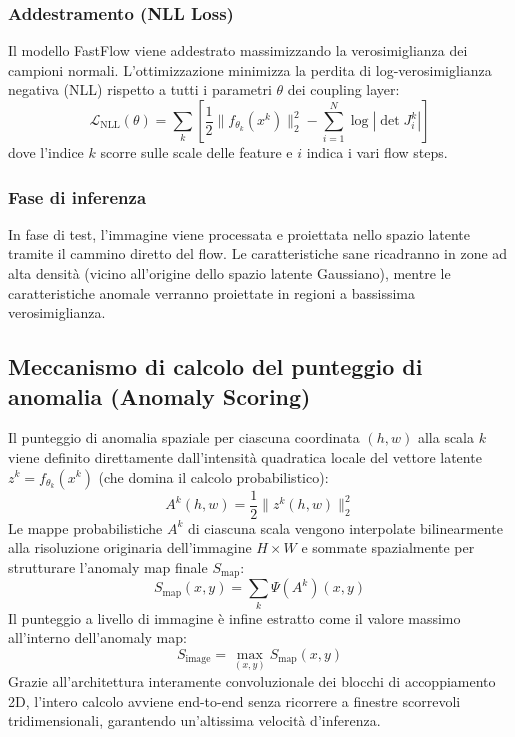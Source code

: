\subsubsection{Addestramento (NLL Loss)}
Il modello FastFlow viene addestrato massimizzando la verosimiglianza dei campioni normali. L'ottimizzazione minimizza la perdita di log-verosimiglianza negativa (NLL) rispetto a tutti i parametri $\theta$ dei coupling layer:
\begin{equation}
    \mathcal{L}_{\text{NLL}}(\theta) = \sum_{k} \left[ \frac{1}{2} \|f_{\theta_k}(x^k)\|_2^2 - \sum_{i=1}^{N} \log \left| \det J_{i}^{k} \right| \right]
\end{equation}
dove l'indice $k$ scorre sulle scale delle feature e $i$ indica i vari flow steps.

\subsubsection{Fase di inferenza}
In fase di test, l'immagine viene processata e proiettata nello spazio latente tramite il cammino diretto del flow. Le caratteristiche sane ricadranno in zone ad alta densità (vicino all'origine dello spazio latente Gaussiano), mentre le caratteristiche anomale verranno proiettate in regioni a bassissima verosimiglianza.

\subsection{Meccanismo di calcolo del punteggio di anomalia (Anomaly Scoring)}
Il punteggio di anomalia spaziale per ciascuna coordinata $(h, w)$ alla scala $k$ viene definito direttamente dall'intensità quadratica locale del vettore latente $z^k = f_{\theta_k}(x^k)$ (che domina il calcolo probabilistico):
\begin{equation}
    A^k(h, w) = \frac{1}{2} \|z^k(h, w)\|_2^2
\end{equation}
Le mappe probabilistiche $A^k$ di ciascuna scala vengono interpolate bilinearmente alla risoluzione originaria dell'immagine $H \times W$ e sommate spazialmente per strutturare l'anomaly map finale $S_{\text{map}}$:
\begin{equation}
    S_{\text{map}}(x, y) = \sum_{k} \Psi(A^k)(x, y)
\end{equation}
Il punteggio a livello di immagine è infine estratto come il valore massimo all'interno dell'anomaly map:
\begin{equation}
    S_{\text{image}} = \max_{(x, y)} S_{\text{map}}(x, y)
\end{equation}
Grazie all'architettura interamente convoluzionale dei blocchi di accoppiamento 2D, l'intero calcolo avviene end-to-end senza ricorrere a finestre scorrevoli tridimensionali, garantendo un'altissima velocità d'inferenza.
